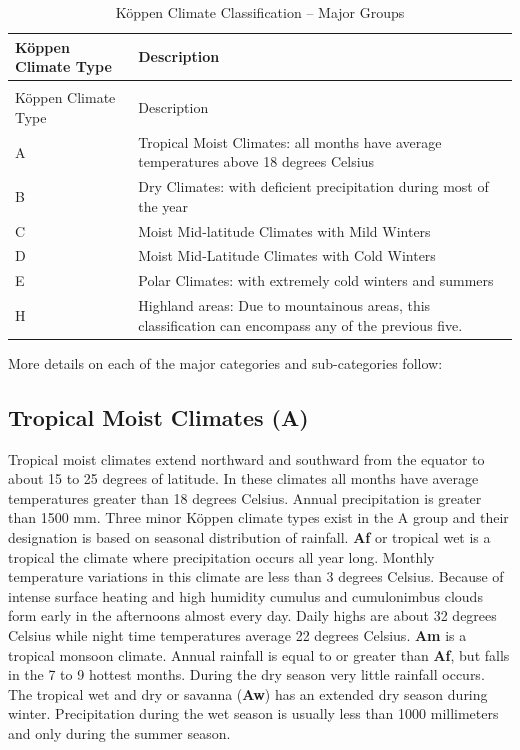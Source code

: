 \begin{longtable}[c]{p{1.5in}p{4.5in}}
\caption{Köppen Climate Classification -- Major Groups \label{table:kppen-climate-classification-major-groups}} \tabularnewline
\toprule 
Köppen Climate Type & Description \tabularnewline
\midrule
\endfirsthead

\caption[]{Köppen Climate Classification -- Major Groups} \tabularnewline
\toprule 
Köppen Climate Type & Description \tabularnewline
\midrule
\endhead

A & Tropical Moist Climates: all months have average temperatures above 18 degrees Celsius \tabularnewline
B & Dry Climates: with deficient precipitation during most of the year \tabularnewline
C & Moist Mid-latitude Climates with Mild Winters \tabularnewline
D & Moist Mid-Latitude Climates with Cold Winters \tabularnewline
E & Polar Climates: with extremely cold winters and summers \tabularnewline
H & Highland areas: Due to mountainous areas, this classification can encompass any of the previous five. \tabularnewline
\bottomrule
\end{longtable}

More details on each of the major categories and sub-categories follow:

\subsection{Tropical Moist Climates (A)}\label{tropical-moist-climates-a}

Tropical moist climates extend northward and southward from the equator to about 15 to 25 degrees of latitude. In these climates all months have average temperatures greater than 18 degrees Celsius. Annual precipitation is greater than 1500 mm. Three minor Köppen climate types exist in the A group and their designation is based on seasonal distribution of rainfall. \textbf{Af} or tropical wet is a tropical the climate where precipitation occurs all year long. Monthly temperature variations in this climate are less than 3 degrees Celsius. Because of intense surface heating and high humidity cumulus and cumulonimbus clouds form early in the afternoons almost every day. Daily highs are about 32 degrees Celsius while night time temperatures average 22 degrees Celsius. \textbf{Am} is a tropical monsoon climate. Annual rainfall is equal to or greater than \textbf{Af}, but falls in the 7 to 9 hottest months. During the dry season very little rainfall occurs. The tropical wet and dry or savanna (\textbf{Aw}) has an extended dry season during winter. Precipitation during the wet season is usually less than 1000 millimeters and only during the summer season.

